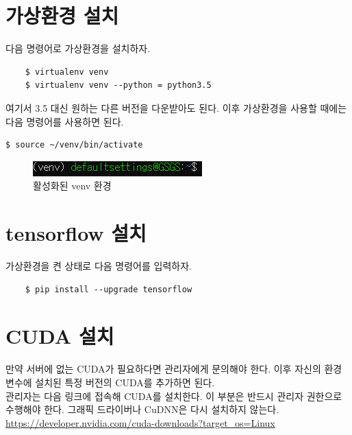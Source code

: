 \section{가상환경 설치}
다음 명령어로 가상환경을 설치하자. 
\begin{lstlisting}
    $ virtualenv venv
    $ virtualenv venv --python = python3.5
\end{lstlisting}
여기서 3.5 대신 원하는 다른 버전을 다운받아도 된다. 
이후 가상환경을 사용할 때에는 다음 명령어를 사용하면 된다.
\begin{lstlisting}[language=bash]
    $ source ~/venv/bin/activate
\end{lstlisting}
\begin{figure}[H]
	\begin{center}
        \includegraphics[width=0.6\linewidth]{venv}
        \caption{활성화된 venv 환경}
    \end{center}
    \end{figure}
\section{tensorflow 설치}
가상환경을 켠 상태로 다음 명령어를 입력하자.
\begin{lstlisting}
    $ pip install --upgrade tensorflow
\end{lstlisting}
\section{CUDA 설치}
만약 서버에 없는 \acs{CUDA}가 필요하다면 관리자에게 문의해야 한다. 이후 자신의 환경변수에 설치된 특정 버전의 \acs{CUDA}를 추가하면 된다.~\\


관리자는 다음 링크에 접속해 \acs{CUDA}를 설치한다. 이 부분은 반드시 관리자 권한으로 수행해야 한다. 그래픽 드라이버나 CuDNN은 다시 설치하지 않는다.\\
    \url{https://developer.nvidia.com/cuda-downloads?target_os=Linux}

